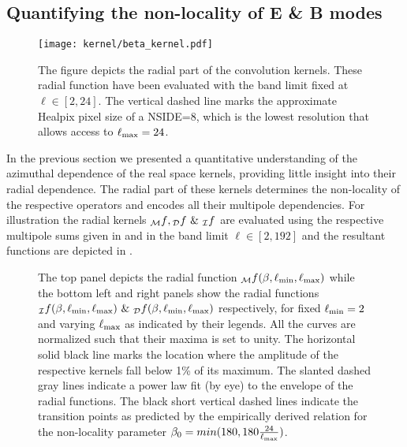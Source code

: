 \subsection{Quantifying the non-locality of E \& B modes} \label{sec:radial_locality}
%
\begin{figure}[t]
\centering
\texttt{[image: kernel/beta\_kernel.pdf]}
\caption{The figure depicts the radial part of the convolution kernels. These radial function have been evaluated with the band limit fixed at $\ell \in [2,24]$. The vertical dashed line marks the approximate Healpix pixel size of a NSIDE=8, which is the lowest resolution that allows access to $\ell_{\rm max}=24$.}
\label{fig:beta_kernel}
\end{figure}
%
In the previous section we presented a quantitative understanding of the  azimuthal dependence of the real space kernels, providing little insight into their radial dependence. The radial part of these kernels determines the non-locality of the respective operators and encodes all their multipole dependencies. For illustration the radial kernels ${_{\mathcal{M}}f}, {_{\mathcal{D}}f} ~\&~ {_{\mathcal{I}}f} $ are evaluated using the respective multipole sums given in  and  in the band limit $\ell \in [2,192]$ and the resultant functions are depicted in . 
%
\begin{figure}[t]
\centering
{}
\caption{The top panel depicts the radial function  ${_{\mathcal{M}}f}(\beta,\ell_{\rm min},\ell_{\rm max})$ while the bottom left and right panels show the radial functions ${}_{\mathcal{I}}f(\beta,\ell_{\rm min},\ell_{\rm max}) ~\&~ {}_{\mathcal{D}}f(\beta,\ell_{\rm min},\ell_{\rm max})$ respectively, for fixed $\ell_{\rm min}=2$ and varying $\ell_{\rm max}$ as indicated by their legends. All the curves are normalized such that their maxima is set to unity. The horizontal solid black line marks the location where the amplitude of the respective kernels fall below 1\% of its maximum. The slanted dashed gray lines indicate a power law fit (by eye) to the envelope of the radial functions. The black short vertical dashed lines indicate the transition points as predicted by the empirically derived relation for the non-locality parameter $\beta_0=min(180,180 \frac{24}{\ell_{\rm max}})$.}
\label{fig:rad_ker_decay}
\end{figure}
%

